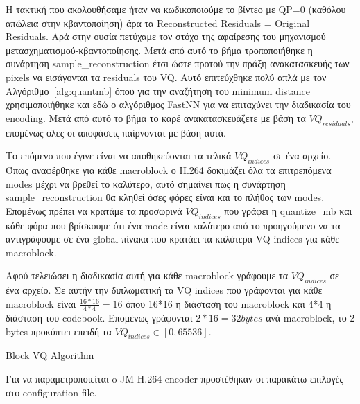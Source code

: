 \indent Η τακτική που ακολουθήσαμε ήταν να κωδικοποιούμε το βίντεο με QP=0 (καθόλου απώλεια στην κβαντοποίηση) άρα τα Reconstructed Residuals = Original Residuals. Αρά στην ουσία πετύχαμε τον στόχο της αφαίρεσης του μηχανισμού μετασχηματισμού-κβαντοποίησης. Μετά από αυτό το βήμα τροποποιήθηκε η συνάρτηση sample\_reconstruction έτσι ώστε προτού την πράξη ανακατασκευής των pixels να εισάγονται τα residuals του VQ. Αυτό επιτεύχθηκε πολύ απλά με τον Αλγόριθμο~\ref{alg:quantmb} όπου για την αναζήτηση του minimum distance χρησιμοποιήθηκε και εδώ ο αλγόριθμος FastNN για να επιταχύνει την διαδικασία του encoding. Μετά από αυτό το βήμα το καρέ ανακατασκευάζετε με βάση τα $VQ_{residuals}$, επομένως όλες οι αποφάσεις παίρνονται με βάση αυτά.

\indent Το επόμενο που έγινε είναι να αποθηκεύονται τα τελικά $VQ_{indices}$ σε ένα αρχείο. Όπως αναφέρθηκε για κάθε macroblock ο H.264 δοκιμάζει όλα τα επιτρεπόμενα modes μέχρι να βρεθεί το καλύτερο, αυτό σημαίνει πως η συνάρτηση sample\_reconstruction θα κληθεί όσες φόρες είναι και το πλήθος των modes. Επομένως πρέπει να κρατάμε τα προσωρινά $VQ_{indices}$ που γράφει η quantize\_mb και κάθε φόρα που βρίσκουμε ότι ένα mode είναι καλύτερο από το προηγούμενο να τα αντιγράφουμε σε ένα global πίνακα που κρατάει τα καλύτερα VQ indices για κάθε macroblock.

\indent Αφού τελειώσει η διαδικασία αυτή για κάθε macroblock γράφουμε τα $VQ_{indices}$ σε ένα αρχείο. Σε αυτήν την διπλωματική τα VQ indices που γράφονται για κάθε macroblock είναι $\frac{16*16}{4*4}=16$ όπου 16*16 η διάσταση του macroblock και 4*4 η διάσταση του codebook. Επομένως γράφονται $2*16 = 32bytes$ ανά macroblock, το 2 bytes προκύπτει επειδή τα $VQ_{indices}\in[0,65536]$.

\begin{algorithm}[h]
\begin{algorithmic}[1]
\EndFor
\EndFunction
\end{algorithmic}
\caption{Block VQ Algorithm}
\label{alg:quantmb}
\end{algorithm}

\indent Για να παραμετροποιείται o JM Η.264 encoder προστέθηκαν οι παρακάτω επιλογές στο configuration file.


